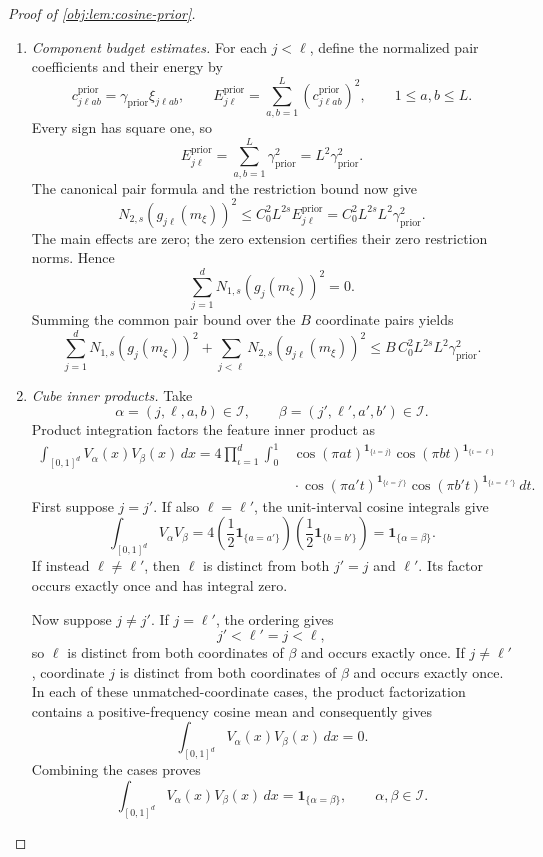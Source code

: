 \begin{proof}[Proof of \cref{obj:lem:cosine-prior}]
\begin{enumerate}
\item \emph{Component budget estimates.}
For each \(j<\ell\), define the normalized pair coefficients and their
energy by
\[
c^{\mathrm{prior}}_{j\ell ab}
=\gamma_{\mathrm{prior}}\xi_{j\ell ab},
\qquad
E^{\mathrm{prior}}_{j\ell}
=\sum_{a,b=1}^L(c^{\mathrm{prior}}_{j\ell ab})^2,
\qquad 1\leq a,b\leq L.
\]
Every sign has square one, so
\[
E^{\mathrm{prior}}_{j\ell}
=\sum_{a,b=1}^L\gamma_{\mathrm{prior}}^2
=L^2\gamma_{\mathrm{prior}}^2.
\]
The canonical pair formula and the restriction bound now give
\[
N_{2,s}(g_{j\ell}(m_\xi))^2
\leq C_0^2L^{2s}E^{\mathrm{prior}}_{j\ell}
=C_0^2L^{2s}L^2\gamma_{\mathrm{prior}}^2.
\]
The main effects are zero; the zero extension certifies their zero
restriction norms. Hence
\[
\sum_{j=1}^dN_{1,s}(g_j(m_\xi))^2=0.
\]
Summing the common pair bound over the \(B\) coordinate pairs yields
\[
\sum_{j=1}^dN_{1,s}(g_j(m_\xi))^2
+\sum_{j<\ell}N_{2,s}(g_{j\ell}(m_\xi))^2
\leq B\,C_0^2L^{2s}L^2\gamma_{\mathrm{prior}}^2.
\]

\item \emph{Cube inner products.}
Take
\[
\alpha=(j,\ell,a,b)\in\mathcal I,
\qquad
\beta=(j',\ell',a',b')\in\mathcal I.
\]
Product integration factors the feature inner product as
\[
\begin{aligned}
\int_{[0,1]^d}V_\alpha(x)V_\beta(x)\,dx
=4\prod_{\iota=1}^d\int_0^1
&\cos(\pi a t)^{\mathbf1_{\{\iota=j\}}}
 \cos(\pi b t)^{\mathbf1_{\{\iota=\ell\}}}\\
&{}\cdot
 \cos(\pi a't)^{\mathbf1_{\{\iota=j'\}}}
 \cos(\pi b't)^{\mathbf1_{\{\iota=\ell'\}}}\,dt .
\end{aligned}
\]
First suppose \(j=j'\). If also \(\ell=\ell'\), the unit-interval cosine
integrals give
\[
\int_{[0,1]^d}V_\alpha V_\beta
=4\left(\frac12\mathbf1_{\{a=a'\}}\right)
  \left(\frac12\mathbf1_{\{b=b'\}}\right)
=\mathbf1_{\{\alpha=\beta\}}.
\]
If instead \(\ell\ne\ell'\), then \(\ell\) is distinct from both
\(j'=j\) and \(\ell'\). Its factor occurs exactly once and has integral
zero.

Now suppose \(j\ne j'\). If \(j=\ell'\), the ordering gives
\[
j'<\ell'=j<\ell,
\]
so \(\ell\) is distinct from both coordinates of \(\beta\) and occurs
exactly once. If \(j\ne\ell'\), coordinate \(j\) is distinct from both
coordinates of \(\beta\) and occurs exactly once. In each of these
unmatched-coordinate cases, the product factorization contains a
positive-frequency cosine mean and consequently gives
\[
\int_{[0,1]^d}V_\alpha(x)V_\beta(x)\,dx=0.
\]
Combining the cases proves
\[
\int_{[0,1]^d}V_\alpha(x)V_\beta(x)\,dx
=\mathbf1_{\{\alpha=\beta\}},
\qquad \alpha,\beta\in\mathcal I.
\]


\end{enumerate}
\end{proof}

